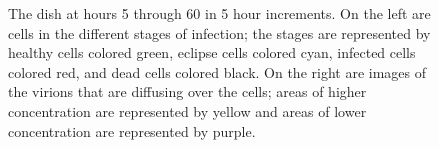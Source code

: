\begin{figure}
\begin{minipage}{0.8\linewidth}
\begin{multicols}{2}
\end{multicols}
\end{minipage}
\caption{The dish at hours 5 through 60 in 5 hour increments. On the left are cells in the different stages of infection; the stages are represented by healthy cells colored green, eclipse cells colored cyan, infected cells colored red, and dead cells colored black. On the right are images of the virions that are diffusing over the cells; areas of higher concentration are represented by yellow and areas of lower concentration are represented by purple. \label{fig_FullDish_cellandvirus}}
\end{figure}

\begin{figure}
\centering
\begin{minipage}{0.66\linewidth}
\centering


\end{minipage}
\end{figure}
